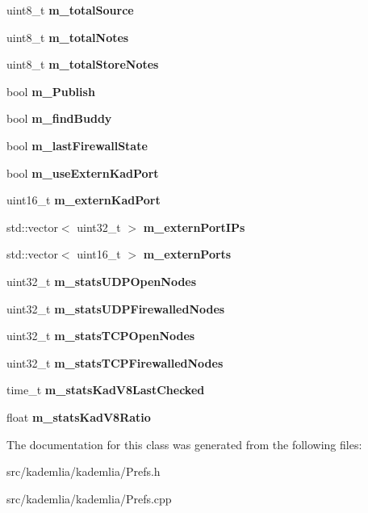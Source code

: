 \begin{DoxyCompactItemize}
\item 
uint8\_\-t {\bfseries m\_\-totalSource}\label{classKademlia_1_1CPrefs_a855b6343924bd30faeae53f538447eaf}

\item 
uint8\_\-t {\bfseries m\_\-totalNotes}\label{classKademlia_1_1CPrefs_ae8f7fd6232ad968a36cee325cb8ca1b5}

\item 
uint8\_\-t {\bfseries m\_\-totalStoreNotes}\label{classKademlia_1_1CPrefs_aed973864afdd2a4b617f5f37df259ea5}

\item 
bool {\bfseries m\_\-Publish}\label{classKademlia_1_1CPrefs_aa93d3728b502d1f7d08d2ede583778bb}

\item 
bool {\bfseries m\_\-findBuddy}\label{classKademlia_1_1CPrefs_a069e874020d13ae0f5d3b52851384a02}

\item 
bool {\bfseries m\_\-lastFirewallState}\label{classKademlia_1_1CPrefs_a34cfd517972e831625afc29ccc922323}

\item 
bool {\bfseries m\_\-useExternKadPort}\label{classKademlia_1_1CPrefs_a8fa464e6a3f42537b68e177c99361e1e}

\item 
uint16\_\-t {\bfseries m\_\-externKadPort}\label{classKademlia_1_1CPrefs_a3633a1a2e68dc351ff06123d129e08d4}

\item 
std::vector$<$ uint32\_\-t $>$ {\bfseries m\_\-externPortIPs}\label{classKademlia_1_1CPrefs_a03a95ad7861ba2fa06a722bac8c30213}

\item 
std::vector$<$ uint16\_\-t $>$ {\bfseries m\_\-externPorts}\label{classKademlia_1_1CPrefs_a146deb0c7be2f7a73f6fdefb27dabe19}

\item 
uint32\_\-t {\bfseries m\_\-statsUDPOpenNodes}\label{classKademlia_1_1CPrefs_a19fda88ef7aa0be3f216fa892f9a29f2}

\item 
uint32\_\-t {\bfseries m\_\-statsUDPFirewalledNodes}\label{classKademlia_1_1CPrefs_a89be2219d0d2b41bc91feec3cf26745d}

\item 
uint32\_\-t {\bfseries m\_\-statsTCPOpenNodes}\label{classKademlia_1_1CPrefs_a57bf17d8f22d0bd02cf2f410096a92cd}

\item 
uint32\_\-t {\bfseries m\_\-statsTCPFirewalledNodes}\label{classKademlia_1_1CPrefs_a2b8fe02964cf21b17342173619a3e147}

\item 
time\_\-t {\bfseries m\_\-statsKadV8LastChecked}\label{classKademlia_1_1CPrefs_ab94e02cec5c299ed55e09336bbc2f34d}

\item 
float {\bfseries m\_\-statsKadV8Ratio}\label{classKademlia_1_1CPrefs_a631c6376a289aa225f0fce4124dd0264}

\end{DoxyCompactItemize}


The documentation for this class was generated from the following files:\begin{DoxyCompactItemize}
\item 
src/kademlia/kademlia/Prefs.h\item 
src/kademlia/kademlia/Prefs.cpp\end{DoxyCompactItemize}
